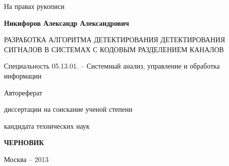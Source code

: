 \hfill На правах рукописи

\vspace{\baselineskip}
\vspace{\baselineskip}
\vspace{\baselineskip}
\vspace{\baselineskip}

\noindent\centerline{\bf{Никифоров Александр Александрович}}

\vspace{\baselineskip}
\vspace{\baselineskip}
\vspace{\baselineskip}
\vspace{\baselineskip}

\noindent\centerline{РАЗРАБОТКА АЛГОРИТМА ДЕТЕКТИРОВАНИЯ ДЕТЕКТИРОВАНИЯ СИГНАЛОВ В СИСТЕМАХ С КОДОВЫМ РАЗДЕЛЕНИЕМ КАНАЛОВ}

\vspace{\baselineskip}
\vspace{\baselineskip}
\vspace{\baselineskip}
\vspace{\baselineskip}

\noindent\centerline{Специальность 05.13.01. – Системный анализ, управление и обработка информации}

\vspace{\baselineskip}
\vspace{\baselineskip}
\vspace{\baselineskip}
\vspace{\baselineskip}

\noindent\centerline{Автореферат} 
\noindent\centerline{диссертации на соискание ученой степени}
\noindent\centerline{кандидата технических наук}


\vspace{\baselineskip}
\vspace{\baselineskip}
\vspace{\baselineskip}
\vspace{\baselineskip}
\noindent\centerline{\bf{ЧЕРНОВИК}}

\vfill
\noindent\centerline{Москва – 2013}

\newpage

\vspace{\baselineskip}
\vspace{\baselineskip}
\vspace{\baselineskip}
\vspace{\baselineskip}

